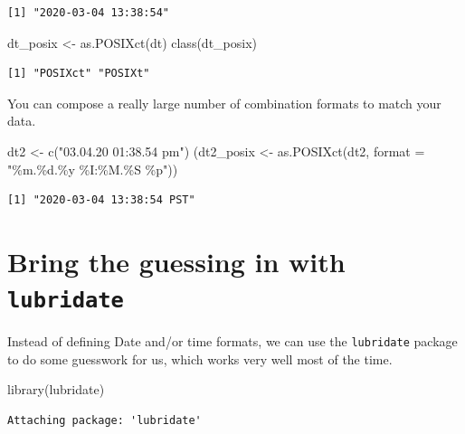 \documentclass[
]{book}
\newenvironment{Shaded}{\begin{snugshade}}{\end{snugshade}}
\newcommand{\AttributeTok}[1]{\textcolor[rgb]{0.77,0.63,0.00}{#1}}
\newcommand{\FunctionTok}[1]{\textcolor[rgb]{0.00,0.00,0.00}{#1}}
\newcommand{\NormalTok}[1]{#1}
\newcommand{\OtherTok}[1]{\textcolor[rgb]{0.56,0.35,0.01}{#1}}
\newcommand{\StringTok}[1]{\textcolor[rgb]{0.31,0.60,0.02}{#1}}
\begin{document}
\begin{verbatim}
[1] "2020-03-04 13:38:54"
\end{verbatim}

\begin{Shaded}
\begin{Highlighting}[]
\NormalTok{dt\_posix }\OtherTok{\textless{}{-}} \FunctionTok{as.POSIXct}\NormalTok{(dt)}
\FunctionTok{class}\NormalTok{(dt\_posix)}
\end{Highlighting}
\end{Shaded}

\begin{verbatim}
[1] "POSIXct" "POSIXt" 
\end{verbatim}

You can compose a really large number of combination formats to match your data.

\begin{Shaded}
\begin{Highlighting}[]
\NormalTok{dt2 }\OtherTok{\textless{}{-}} \FunctionTok{c}\NormalTok{(}\StringTok{"03.04.20 01:38.54 pm"}\NormalTok{)}
\NormalTok{(dt2\_posix }\OtherTok{\textless{}{-}} \FunctionTok{as.POSIXct}\NormalTok{(dt2, }\AttributeTok{format =} \StringTok{"\%m.\%d.\%y \%I:\%M.\%S \%p"}\NormalTok{))}
\end{Highlighting}
\end{Shaded}

\begin{verbatim}
[1] "2020-03-04 13:38:54 PST"
\end{verbatim}

\hypertarget{bring-the-guessing-in-with-lubridate}{%
\section{\texorpdfstring{Bring the guessing in with \texttt{lubridate}}{Bring the guessing in with lubridate}}\label{bring-the-guessing-in-with-lubridate}}

Instead of defining Date and/or time formats, we can use the \texttt{lubridate} package to do some guesswork for us, which works very well most of the time.

\begin{Shaded}
\begin{Highlighting}[]
\FunctionTok{library}\NormalTok{(lubridate)}
\end{Highlighting}
\end{Shaded}

\begin{verbatim}
Attaching package: 'lubridate'
\end{verbatim}
\end{document}
